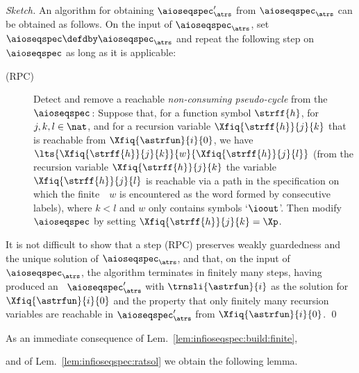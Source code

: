 \begin{proof}[Sketch]
An algorithm for obtaining $\aioseqspec'_{\atrs}$
  from $\aioseqspec_{\atrs}$ can be obtained as follows.
  On the input of $\aioseqspec_{\atrs}$,
  set $\aioseqspec\defdby\aioseqspec_{\atrs}$ and 
  repeat the following step on $\aioseqspec$ as long as it is applicable:
\begin{description}
\item[{\sf (RPC)}]
      Detect and remove a reachable \emph{non-consuming pseudo-cycle} from the 
      \infioseqspec~$\aioseqspec\,$:
      Suppose that, for a function symbol $\strff{h}$, for $j,k,l\in\nat$,
      and for a recursion variable $\Xfiq{\strff{h}}{j}{k}$ that is reachable
      from $\Xfiq{\astrfun}{i}{0}$, we have
      $ \lts{\Xfiq{\strff{h}}{j}{k}}{w}{\Xfiq{\strff{h}}{j}{l}} $
      (from the recursion variable $\Xfiq{\strff{h}}{j}{k}$
       the variable $\Xfiq{\strff{h}}{j}{l}$ is reachable
       via a path in the specification on which the finite~\ioseq~$w$
       is encountered as the word formed by consecutive labels),
      where $k<l$ and $w$ only contains symbols `$\ioout$'.
      Then modify $\aioseqspec$ by setting
      $ \Xfiq{\strff{h}}{j}{k} = \Xp $.
\end{description}
It is not difficult to show that a step {\sf (RPC)} 
  preserves weakly guardedness and the unique solution 
  of $\aioseqspec_{\atrs}$, 
  and that, on the input of $\aioseqspec_{\atrs}$, 
  the algorithm terminates in finitely many steps, 
  having produced an \infioseqspec~$\aioseqspec'_{\atrs}$ 
  with $\trnsli{\astrfun}{i}$ as the solution for $\Xfiq{\astrfun}{i}{0}$
  and the property
  that only finitely many recursion variables are reachable
  in $\aioseqspec'_{\atrs}$ from
  $\Xfiq{\astrfun}{i}{0}$.
  \qed
\end{proof}


As an immediate consequence of 
Lem.~\ref{lem:infioseqspec:build:finite},
 
and of Lem.~\ref{lem:infioseqspec:ratsol} we obtain the following lemma.


